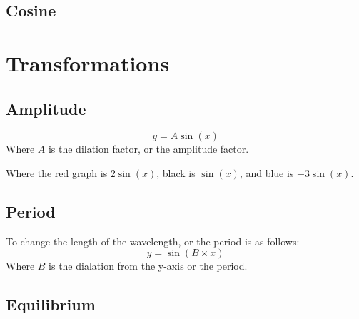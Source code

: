 \documentclass{book}
\newenvironment{generalInformation}{}{}
\newenvironment{explanationOfTerms}{}{}
\begin{document}
\subsection{Cosine}
\begin{center}
\end{center}

\section{Transformations}
\subsection{Amplitude}
\[
	y = A\sin(x)
\]
Where $A$ is the dilation factor, or the amplitude factor.
\begin{center}

	Where the red graph is $2\sin(x)$, black is $\sin(x)$, and blue is $-3\sin(x)$.
\end{center}

\subsection{Period}
\begin{generalInformation}
	To change the length of the wavelength, or the period is as follows:
\end{generalInformation}
\[
	y = \sin(B \times x)
\]
\begin{explanationOfTerms}
	Where $B$ is the dialation from the y-axis or the period.
\end{explanationOfTerms}

\subsection{Equilibrium}
\end{document}

